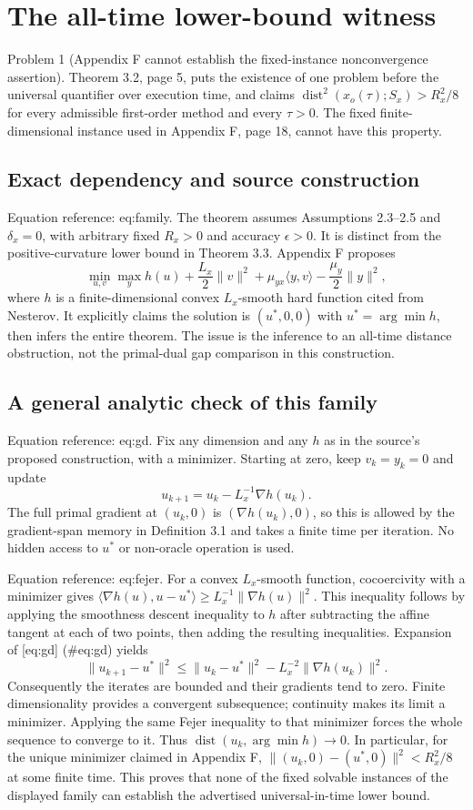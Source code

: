 \documentclass[10pt]{article}
\begin{document}
\section*{The all-time lower-bound witness}
Problem 1 (Appendix F cannot establish the fixed-instance nonconvergence assertion).  Theorem 3.2, page 5, puts the existence of one problem before the universal quantifier over execution time, and claims \(\operatorname{dist}^2(x_o(\tau);S_x)>R_x^2/8\) for every admissible first-order method and every \(\tau>0\). The fixed finite-dimensional instance used in Appendix F, page 18, cannot have this property.\par
\subsection*{Exact dependency and source construction}
Equation reference: eq:family. The theorem assumes Assumptions 2.3–2.5 and \(\delta_x=0\), with arbitrary fixed \(R_x>0\) and accuracy \(\epsilon>0\). It is distinct from the positive-curvature lower bound in Theorem 3.3. Appendix F proposes \[\min_{u,v}\max_y h(u)+\frac{L_x}{2}\|v\|^2+\mu_{yx}\langle y,v\rangle-\frac{\mu_y}{2}\|y\|^2,\] where \(h\) is a finite-dimensional convex \(L_x\)-smooth hard function cited from Nesterov. It explicitly claims the solution is \((u^*,0,0)\) with \(u^*=\arg\min h\), then infers the entire theorem. The issue is the inference to an all-time distance obstruction, not the primal-dual gap comparison in this construction.\par
\subsection*{A general analytic check of this family}
Equation reference: eq:gd. Fix any dimension and any \(h\) as in the source’s proposed construction, with a minimizer. Starting at zero, keep \(v_k=y_k=0\) and update \[u_{k+1}=u_k-L_x^{-1}\nabla h(u_k).\] The full primal gradient at \((u_k,0)\) is \((\nabla h(u_k),0)\), so this is allowed by the gradient-span memory in Definition 3.1 and takes a finite time per iteration. No hidden access to \(u^*\) or non-oracle operation is used.\par
Equation reference: eq:fejer. For a convex \(L_x\)-smooth function, cocoercivity with a minimizer gives \(\langle\nabla h(u),u-u^*\rangle\geq L_x^{-1}\|\nabla h(u)\|^2\). This inequality follows by applying the smoothness descent inequality to \(h\) after subtracting the affine tangent at each of two points, then adding the resulting inequalities. Expansion of [eq:gd] (\#eq:gd) yields \[\|u_{k+1}-u^*\|^2\leq\|u_k-u^*\|^2-L_x^{-2}\|\nabla h(u_k)\|^2.\] Consequently the iterates are bounded and their gradients tend to zero. Finite dimensionality provides a convergent subsequence; continuity makes its limit a minimizer. Applying the same Fejer inequality to that minimizer forces the whole sequence to converge to it. Thus \(\operatorname{dist}(u_k,\arg\min h)\to0\). In particular, for the unique minimizer claimed in Appendix F, \(\|(u_k,0)-(u^*,0)\|^2<R_x^2/8\) at some finite time. This proves that none of the fixed solvable instances of the displayed family can establish the advertised universal-in-time lower bound.\par
\end{document}

